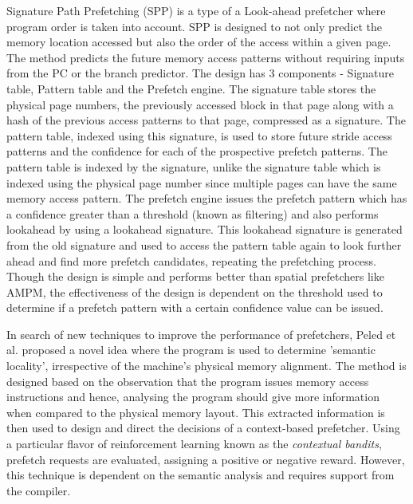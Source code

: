\documentclass[conference]{IEEEtran}
\begin{document}
Signature Path Prefetching \cite{SPP} (SPP) is a type of a Look-ahead prefetcher where program order is taken into account. SPP is designed to not only predict the memory location accessed but also the order of the access within a given page. The method predicts the future memory access patterns without requiring inputs from the PC or the branch predictor. The design has 3 components - Signature table, Pattern table and the Prefetch engine. The signature table stores the physical page numbers, the previously accessed block in that page along with a hash of the previous access patterns to that page, compressed as a signature. The pattern table, indexed using this signature, is used to store future stride access patterns and the confidence for each of the prospective prefetch patterns. The pattern table is indexed by the signature, unlike the signature table which is indexed using the physical page number since multiple pages can have the same memory access pattern. The prefetch engine issues the prefetch pattern which has a confidence greater than a threshold (known as filtering) and also performs lookahead by using a lookahead signature. This lookahead signature is generated from the old signature and used to access the pattern table again to look further ahead and find more prefetch candidates, repeating the prefetching process. Though the design is simple and performs better than spatial prefetchers like AMPM\cite{AMPM}, the effectiveness of the design is dependent on the threshold used to determine if a prefetch pattern with a certain confidence value can be issued.

In search of new techniques to improve the performance of prefetchers, Peled et al. \cite{semantic-locality} proposed a novel idea where the program is used to determine 'semantic locality', irrespective of the machine's physical memory alignment. The method is designed based on the observation that the program issues memory access instructions and hence, analysing the program should give more information when compared to the physical memory layout. This extracted information is then used to design and direct the decisions of a context-based prefetcher. Using a particular flavor of reinforcement learning known as the \textit{contextual bandits},  prefetch requests are evaluated, assigning a positive or negative reward. However, this technique is dependent on the semantic analysis and requires support from the compiler. 
\end{document}
